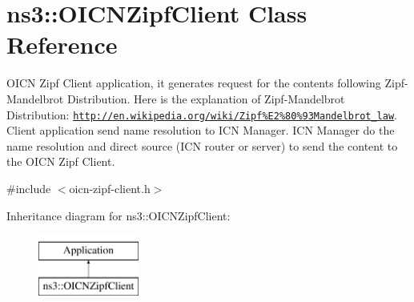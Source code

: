 \hypertarget{classns3_1_1OICNZipfClient}{\section{ns3\-:\-:O\-I\-C\-N\-Zipf\-Client Class Reference}
\label{classns3_1_1OICNZipfClient}
}


O\-I\-C\-N Zipf Client application, it generates request for the contents following Zipf-\/\-Mandelbrot Distribution. Here is the explanation of Zipf-\/\-Mandelbrot Distribution\-: \href{http://en.wikipedia.org/wiki/Zipf%E2%80%93Mandelbrot_law}{\tt http\-://en.\-wikipedia.\-org/wiki/\-Zipf\%\-E2\%80\%93\-Mandelbrot\-\_\-law}. Client application send name resolution to I\-C\-N Manager. I\-C\-N Manager do the name resolution and direct source (I\-C\-N router or server) to send the content to the O\-I\-C\-N Zipf Client.  




{\ttfamily \#include $<$oicn-\/zipf-\/client.\-h$>$}

Inheritance diagram for ns3\-:\-:O\-I\-C\-N\-Zipf\-Client\-:\begin{figure}[H]
\begin{center}
\leavevmode
\includegraphics[height=2.000000cm]{classns3_1_1OICNZipfClient}
\end{center}
\end{figure}
